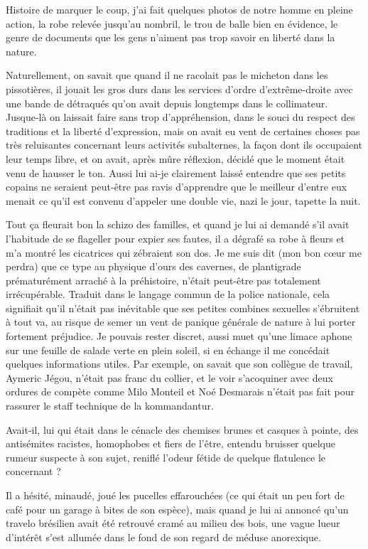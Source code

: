 Histoire de marquer le coup, j’ai fait quelques photos de notre homme en pleine action, la robe relevée jusqu’au nombril, le trou de balle bien en évidence, le genre de documents que les gens n’aiment pas trop savoir en liberté dans la nature.

Naturellement, on savait que quand il ne racolait pas le micheton dans les pissotières, il jouait les gros durs dans les services d’ordre d’extrême-droite avec une bande de détraqués qu’on avait depuis longtemps dans le collimateur. Jusque-là on laissait faire sans trop d’appréhension, dans le souci du respect des traditions et la liberté d’expression, mais on avait eu vent de certaines choses pas très reluisantes concernant leurs activités subalternes, la façon dont ils occupaient leur temps libre, et on avait, après mûre réflexion, décidé que le moment était venu de hausser le ton. Aussi lui ai-je clairement laissé entendre que ses petits copains ne seraient peut-être pas ravis d’apprendre que le meilleur d’entre eux menait ce qu’il est convenu d’appeler une double vie, nazi le jour, tapette la nuit.

Tout ça fleurait bon la schizo des familles, et quand je lui ai demandé s’il avait l’habitude de se flageller pour expier ses fautes, il a dégrafé sa robe à fleurs et m’a montré les cicatrices qui zébraient son dos. Je me suis dit (mon bon cœur me perdra) que ce type au physique d’ours des cavernes, de plantigrade prématurément arraché à la préhistoire, n’était peut-être pas totalement irrécupérable. Traduit dans le langage commun de la police nationale, cela signifiait qu’il n’était pas inévitable que ses petites combines sexuelles s’ébruitent à tout va, au risque de semer un vent de panique générale de nature à lui porter fortement préjudice. Je pouvais rester discret, aussi muet qu’une limace aphone sur une feuille de salade verte en plein soleil, si en échange il me concédait quelques informations utiles. Par exemple, on savait que son collègue de travail, Aymeric Jégou, n’était pas franc du collier, et le voir s’acoquiner avec deux ordures de compète comme Milo Monteil et Noé Desmarais n’était pas fait pour rassurer le staff technique de la kommandantur.

Avait-il, lui qui était dans le cénacle des chemises brunes et casques à pointe, des antisémites racistes, homophobes et fiers de l’être, entendu bruisser quelque rumeur suspecte à son sujet, reniflé l’odeur fétide de quelque flatulence le concernant ?

Il a hésité, minaudé, joué les pucelles effarouchées (ce qui était un peu fort de café pour un garage à bites de son espèce), mais quand je lui ai annoncé qu’un travelo brésilien avait été retrouvé cramé au milieu des bois, une vague lueur d’intérêt s’est allumée dans le fond de son regard de méduse anorexique.

